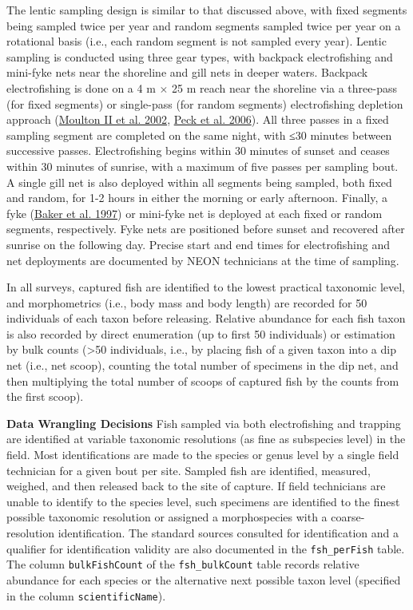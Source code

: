 \documentclass[
  12pt,
]{article}
\begin{document}
The lentic sampling design is similar to that discussed above, with fixed segments being sampled twice per year and random segments sampled twice per year on a rotational basis (i.e., each random segment is not sampled every year). Lentic sampling is conducted using three gear types, with backpack electrofishing and mini-fyke nets near the shoreline and gill nets in deeper waters. Backpack electrofishing is done on a 4 m \(\times\) 25 m reach near the shoreline via a three-pass (for fixed segments) or single-pass (for random segments) electrofishing depletion approach (\protect\hyperlink{ref-moulton2002revised}{Moulton II et al. 2002}, \protect\hyperlink{ref-peck2006environmental}{Peck et al. 2006}). All three passes in a fixed sampling segment are completed on the same night, with ≤30 minutes between successive passes. Electrofishing begins within 30 minutes of sunset and ceases within 30 minutes of sunrise, with a maximum of five passes per sampling bout. A single gill net is also deployed within all segments being sampled, both fixed and random, for 1-2 hours in either the morning or early afternoon. Finally, a fyke (\protect\hyperlink{ref-baker1997environmental}{Baker et al. 1997}) or mini-fyke net is deployed at each fixed or random segments, respectively. Fyke nets are positioned before sunset and recovered after sunrise on the following day. Precise start and end times for electrofishing and net deployments are documented by NEON technicians at the time of sampling.

In all surveys, captured fish are identified to the lowest practical taxonomic level, and morphometrics (i.e., body mass and body length) are recorded for 50 individuals of each taxon before releasing. Relative abundance for each fish taxon is also recorded by direct enumeration (up to first 50 individuals) or estimation by bulk counts (\textgreater50 individuals, i.e., by placing fish of a given taxon into a dip net (i.e., net scoop), counting the total number of specimens in the dip net, and then multiplying the total number of scoops of captured fish by the counts from the first scoop).

\textbf{Data Wrangling Decisions} Fish sampled via both electrofishing and trapping are identified at variable taxonomic resolutions (as fine as subspecies level) in the field. Most identifications are made to the species or genus level by a single field technician for a given bout per site. Sampled fish are identified, measured, weighed, and then released back to the site of capture. If field technicians are unable to identify to the species level, such specimens are identified to the finest possible taxonomic resolution or assigned a morphospecies with a coarse-resolution identification. The standard sources consulted for identification and a qualifier for identification validity are also documented in the \texttt{fsh\_perFish} table. The column \texttt{bulkFishCount} of the \texttt{fsh\_bulkCount} table records relative abundance for each species or the alternative next possible taxon level (specified in the column \texttt{scientificName}).
\end{document}
